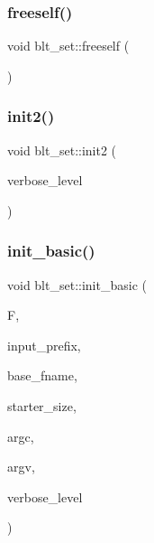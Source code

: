 \mbox{\label{classblt__set_abc48dfb6e214be890bd2a8c28dcdaae0}} 
\subsubsection{\texorpdfstring{freeself()}{freeself()}}
{\footnotesize\ttfamily void blt\+\_\+set\+::freeself (\begin{DoxyParamCaption}{ }\end{DoxyParamCaption})}

\mbox{\label{classblt__set_a3f1204faeab71c253039beffa3e6ee76}} 
\subsubsection{\texorpdfstring{init2()}{init2()}}
{\footnotesize\ttfamily void blt\+\_\+set\+::init2 (\begin{DoxyParamCaption}\item[{\mbox{\hyperlink{galois_8h_a09fddde158a3a20bd2dcadb609de11dc}{I\+NT}}}]{verbose\+\_\+level }\end{DoxyParamCaption})}

\mbox{\label{classblt__set_a266dfb03016b68440e810771101442cc}} 
\subsubsection{\texorpdfstring{init\+\_\+basic()}{init\_basic()}}
{\footnotesize\ttfamily void blt\+\_\+set\+::init\+\_\+basic (\begin{DoxyParamCaption}\item[{\mbox{\hyperlink{classfinite__field}{finite\+\_\+field}} $\ast$}]{F,  }\item[{const \mbox{\hyperlink{galois_8h_ab6cc7b4aeb6ea31aba2b3fbfc83ff5e6}{B\+Y\+TE}} $\ast$}]{input\+\_\+prefix,  }\item[{const \mbox{\hyperlink{galois_8h_ab6cc7b4aeb6ea31aba2b3fbfc83ff5e6}{B\+Y\+TE}} $\ast$}]{base\+\_\+fname,  }\item[{\mbox{\hyperlink{galois_8h_a09fddde158a3a20bd2dcadb609de11dc}{I\+NT}}}]{starter\+\_\+size,  }\item[{int}]{argc,  }\item[{const char $\ast$$\ast$}]{argv,  }\item[{\mbox{\hyperlink{galois_8h_a09fddde158a3a20bd2dcadb609de11dc}{I\+NT}}}]{verbose\+\_\+level }\end{DoxyParamCaption})}

